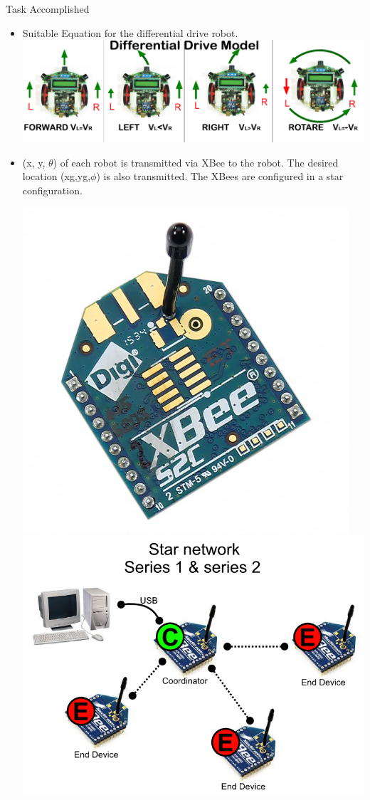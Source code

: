 \documentclass[11pt, a4paper]{beamer}
\begin{document}
\begin{frame}{Task Accomplished}
\begin{itemize}

		\item Suitable Equation for the differential drive robot. \\
		\includegraphics[scale =.40]{images/ddrive.jpg}
		\item (x, y, $\theta$) of each robot is transmitted via XBee to the robot. The desired location (xg,yg,$\phi$) is also transmitted. The XBees are configured in a star configuration. 
		\\ \begin{center}
			\includegraphics[scale =.1]{images/xbee.jpg}
			\includegraphics[scale =.1]{images/star.png}

\end{center}
\end{itemize}
\end{frame}
\end{document}
